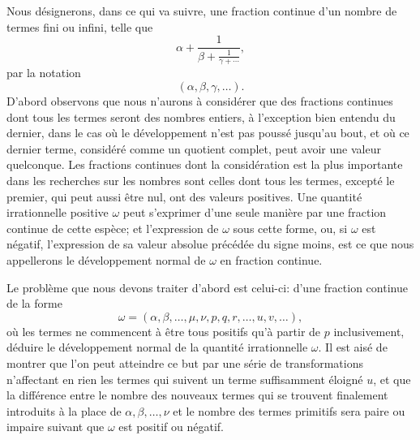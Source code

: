 \documentclass[11pt]{article}
\begin{document}
Nous désignerons, dans ce qui va suivre, une fraction continue d'un nombre de termes fini ou infini, telle que
\[
  \alpha+\frac{1}{\beta+\frac{1}{\gamma+\cdots}},
\]
par la notation
\[
  (\alpha,\beta,\gamma,\ldots).
\]
D'abord observons que nous n'aurons à considérer que des fractions continues dont tous les termes seront des nombres entiers, à l'exception bien entendu du dernier, dans le cas où le développement n'est pas poussé jusqu'au bout, et où ce dernier terme, considéré comme un quotient complet, peut avoir une valeur quelconque. Les fractions continues dont la considération est la plus importante dans les recherches sur les nombres sont celles dont tous les termes, excepté le premier, qui peut aussi être nul, ont des valeurs positives. Une quantité irrationnelle positive $\omega$ peut s'exprimer d'une seule manière par une fraction continue de cette espèce; et l'expression de $\omega$ sous cette forme, ou, si $\omega$ est négatif, l'expression de sa valeur absolue précédée du signe moins, est ce que nous appellerons le développement normal de $\omega$ en fraction continue.

Le problème que nous devons traiter d'abord est celui-ci: d'une fraction continue de la forme
\[
  \omega=(\alpha,\beta,\ldots,\mu,\nu,p,q,r,\ldots,u,v,\ldots),
\]
où les termes ne commencent à être tous positifs qu'à partir de $p$ inclusivement, déduire le développement normal de la quantité irrationnelle $\omega$. Il est aisé de montrer que l'on peut atteindre ce but par une série de transformations n'affectant en rien les termes qui suivent un terme suffisamment éloigné $u$, et que la différence entre le nombre des nouveaux termes qui se trouvent finalement introduits à la place de $\alpha,\beta,\ldots,\nu$ et le nombre des termes primitifs sera paire ou impaire suivant que $\omega$ est positif ou négatif.
\end{document}
